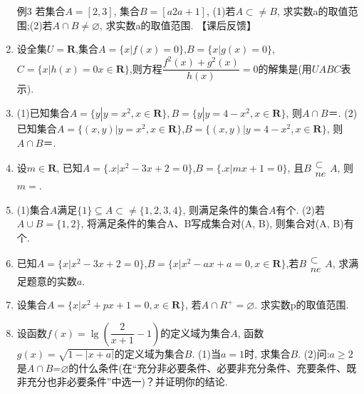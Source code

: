 \documentclass[10pt,a4paper]{article}
\begin{document}
\begin{enumerate}[1.]
例3 若集合$A=[2,3]$, 集合$B=[a2a+1]$, (1)若$A$$\subset \ne$$B$, 求实数a的取值范围;(2)若$A\cap B\ne \varnothing$, 求实数a的取值范围.
【课后反馈】
\item 设全集$U=$$\mathbf{R}$,集合$A=\{ x| f(x)=0  \}$,$B=\{ x| g(x)=0  \}$,$C=\{ x| h(x)=0 x\in \mathbf{R} \}$,则方程$\dfrac{{f^2}(x)+{g^2}(x)}{h(x)}=0$的解集是(用$UABC$表示).
\item (1)已知集合$A=\{ y| y={x^2},x\in \mathbf{R}  \},B=\{ y| y=4-{x^2},x\in \mathbf{R}  \}$, 则$A\cap B$＝.
(2)已知集合$A=\{ ( x,y)| y={x^2},x\in \mathbf{R}  \}$,$B=\{ ( x,y)| y=4-{x^2},x\in \mathbf{R}  \}$, 则$A\cap B$＝.
\item 设$m\in \mathbf{R}$, 已知$A=\{ . x |{x^2}-3x+2=0 \}$,$B=\{ . x |mx+1=0 \}$, 且$B\begin{matrix}
\subset\\ne\end{matrix}A$, 则$m=$.
\item (1)集合$A$满足$\{ 1 \}\subseteq A$$\subset \ne$$\{1,2,3,4 \}$, 则满足条件的集合$A$有个.
(2)若$A\cup B=\{1,2 \}$, 将满足条件的集合A、B写成集合对(A, B), 则集合对(A, B)有个.
\item 已知$A=\{x|{x^2}-3x+2=0 \}$,$B=\{x|{x^2}-ax+a=0,x\in \mathbf{R}\}$,若$B\begin{matrix}
\subset\\ne\end{matrix}A$, 求满足题意的实数$a$.
\item 设集合$A=\{x|{x^2}+px+1=0,x\in \mathbf{R}\}$, 若$A\cap {R^+}=\varnothing .$ 求实数p的取值范围.
\item 设函数$f(x)=\lg (\dfrac2{x+1}-1)$的定义域为集合$A$, 函数$g( x)=\sqrt{1-| x+a |}$的定义域为集合$B$.
(1)当$a=1$时, 求集合$B$.
(2)问:$a\ge 2$是$A\cap B$=$\varnothing$的什么条件(在``充分非必要条件、必要非充分条件、充要条件、既非充分也非必要条件''中选一)？并证明你的结论.

\end{enumerate}
\end{document}
